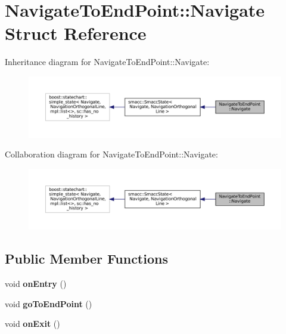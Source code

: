 \hypertarget{structNavigateToEndPoint_1_1Navigate}{}\section{Navigate\+To\+End\+Point\+:\+:Navigate Struct Reference}
\label{structNavigateToEndPoint_1_1Navigate}


Inheritance diagram for Navigate\+To\+End\+Point\+:\+:Navigate\+:
\nopagebreak
\begin{figure}[H]
\begin{center}
\leavevmode
\includegraphics[width=350pt]{structNavigateToEndPoint_1_1Navigate__inherit__graph}
\end{center}
\end{figure}


Collaboration diagram for Navigate\+To\+End\+Point\+:\+:Navigate\+:
\nopagebreak
\begin{figure}[H]
\begin{center}
\leavevmode
\includegraphics[width=350pt]{structNavigateToEndPoint_1_1Navigate__coll__graph}
\end{center}
\end{figure}
\subsection*{Public Member Functions}
\begin{DoxyCompactItemize}
\item 
\mbox{\label{structNavigateToEndPoint_1_1Navigate_a97b145eda2187b8256956199c326180e}} 
void {\bfseries on\+Entry} ()
\item 
\mbox{\label{structNavigateToEndPoint_1_1Navigate_a67813e26712c2ddddb4d21a6e0bb6e5d}} 
void {\bfseries go\+To\+End\+Point} ()
\item 
\mbox{\label{structNavigateToEndPoint_1_1Navigate_a3088d59f79aaa269afcdbe2e0f346a64}} 
void {\bfseries on\+Exit} ()
\end{DoxyCompactItemize}
